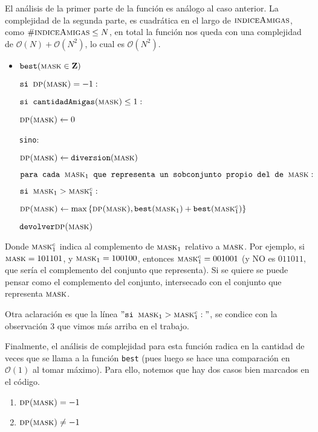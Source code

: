 	El análisis de la primer parte de la función es análogo al caso anterior. La complejidad de la segunda parte, es cuadrática en el largo de $\textsc{indiceAmigas}$, como $\# \textsc{indiceAmigas} \leq N$, en total la función nos queda con una complejidad de $\mathcal{O}(N) + \mathcal{O}(N^2)$, lo cual es $\mathcal{O}(N^2)$.
	
\begin{itemize}
	
	\item $\texttt{best}(\textsc{mask} \in \mathbf{Z})$
	
	$\texttt{si } \textsc{dp(mask)} = -1:$
	
	\quad 	$\texttt{si cantidadAmigas}(\textsc{mask}) \leq 1:$
	
	\quad \quad $ \textsc{dp(mask)} \leftarrow 0$
	
	\quad \texttt{sino}:
	
	\quad \quad $ \textsc{dp(mask)} \leftarrow \texttt{diversion}(\textsc{mask})$
	
	\quad \quad $ \texttt{para cada } \textsc{mask}_1 \texttt{ que representa un sobconjunto propio del de } \textsc{mask}:$
	
	\quad \quad \quad $\texttt{si } \textsc{mask}_1 > \textsc{mask}_1^c:$
	
	\quad \quad \quad \quad $\textsc{dp(mask)} \leftarrow \text{max} \left  \{ \textsc{dp(mask)}, \texttt{best}(\textsc{mask}_1) + \texttt{best}(\textsc{mask}_1^c)  \right \} $
	
	$\texttt{devolver} \textsc{dp(mask)}$
	
\end{itemize}	

	Donde $\textsc{mask}_1^c$ indica al complemento de $\textsc{mask}_1$ relativo a $\textsc{mask}$. Por ejemplo, si $\textsc{mask} = 101101$, y $\textsc{mask}_1 = 100100$, entonces $\textsc{mask}_1^c = 001001$ (y NO es $011011$, que sería el complemento del conjunto que representa). Si se quiere se puede pensar como el complemento del conjunto, intersecado con el conjunto que representa $\textsc{mask}$.
	
	Otra aclaración es que la línea $" \texttt{si } \textsc{mask}_1 > \textsc{mask}_1^c:"$, se condice con la observación 3 que vimos más arriba en el trabajo.
	
	Finalmente, el análisis de complejidad para esta función radica en la cantidad de veces que se llama a la función \texttt{best} (pues luego se hace una comparación en $\mathcal{O}(1)$ al tomar máximo). Para ello, notemos que hay dos casos bien marcados en el código. 
	\begin{enumerate}
		\item $\textsc{dp(mask)} = -1$
		\item $\textsc{dp(mask)} \neq -1$
	\end{enumerate}

